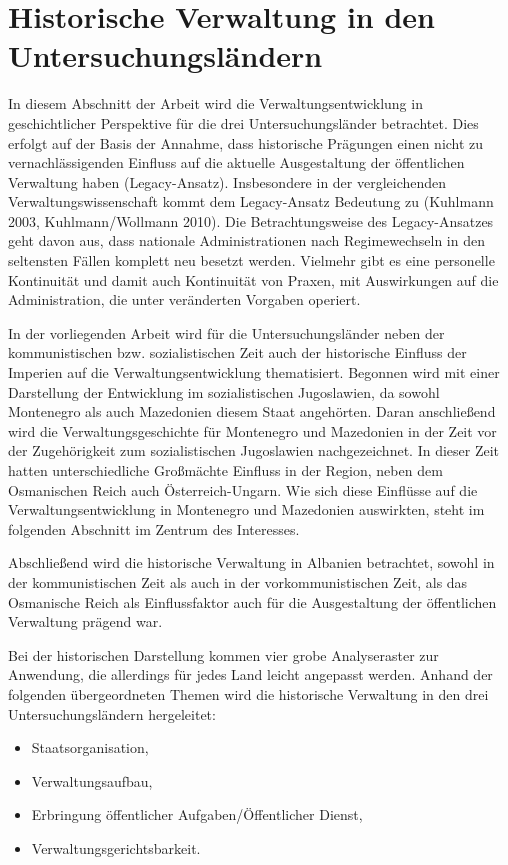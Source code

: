 \section{ Historische Verwaltung in den Untersuchungsländern }
In diesem Abschnitt der Arbeit wird die Verwaltungsentwicklung in geschichtlicher Perspektive für die drei Untersuchungsländer betrachtet. Dies erfolgt auf der Basis der Annahme, dass historische Prägungen einen nicht zu vernachlässigenden Einfluss auf die aktuelle Ausgestaltung der öffentlichen Verwaltung haben (Legacy-Ansatz). Insbesondere in der vergleichenden Verwaltungswissenschaft kommt dem Legacy-Ansatz Bedeutung zu (Kuhlmann 2003, Kuhlmann/Wollmann 2010). Die Betrachtungsweise des Legacy-Ansatzes geht davon aus, dass nationale Administrationen nach Regimewechseln in den seltensten Fällen komplett neu besetzt werden. Vielmehr gibt es eine personelle Kontinuität und damit auch Kontinuität von Praxen, mit Auswirkungen auf die Administration, die unter veränderten Vorgaben operiert.\par
In der vorliegenden Arbeit wird für die Untersuchungsländer neben der kommunistischen bzw. sozialistischen Zeit auch der historische Einfluss der Imperien auf die Verwaltungsentwicklung thematisiert. Begonnen wird mit einer Darstellung der Entwicklung im sozialistischen Jugoslawien, da sowohl Montenegro als auch Mazedonien diesem Staat angehörten. Daran anschließend wird die Verwaltungsgeschichte für Montenegro und Mazedonien in der Zeit vor der Zugehörigkeit zum sozialistischen Jugoslawien nachgezeichnet. In dieser Zeit hatten unterschiedliche Großmächte Einfluss in der Region, neben dem Osmanischen Reich auch Österreich-Ungarn. Wie sich diese Einflüsse auf die Verwaltungsentwicklung in Montenegro und Mazedonien auswirkten, steht im folgenden Abschnitt im Zentrum des Interesses.\par
Abschließend wird die historische Verwaltung in Albanien betrachtet, sowohl in der kommunistischen Zeit als auch in der vorkommunistischen Zeit, als das Osmanische Reich als Einflussfaktor auch für die Ausgestaltung der öffentlichen Verwaltung prägend war.\par
Bei der historischen Darstellung kommen vier grobe Analyseraster zur Anwendung, die allerdings für jedes Land leicht angepasst werden. Anhand der folgenden übergeordneten Themen wird die historische Verwaltung in den drei Untersuchungsländern hergeleitet:
\begin{itemize}
\item Staatsorganisation,
\item Verwaltungsaufbau,
\item Erbringung öffentlicher Aufgaben/Öffentlicher Dienst,
\item Verwaltungsgerichtsbarkeit.
\end{itemize}

